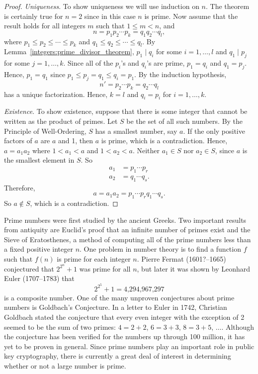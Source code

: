 \begin{proof}
\emph{Uniqueness}.
To show uniqueness we will use induction on $n$. The theorem is certainly true for $n = 2$ since in this case $n$ is prime.  Now assume that the result holds for all integers $m$ such that $1 \leq m < n$, and 
\[
n = p_1 p_2 \cdots p_k = q_1 q_2 \cdots q_l,
\]
where $p_1 \leq p_2 \leq \cdots \leq p_k$ and $q_1 \leq q_2 \leq \cdots \leq q_l$. By Lemma~\ref{integers:prime_divisor_theorem}, $p_1  \mid  q_i$ for some $i = 1, \ldots, l$ and $q_1  \mid  p_j$ for some $j = 1, \ldots, k$.  Since all of the $p_i$'s and $q_i$'s are prime, $p_1 = q_i$ and  $q_1 = p_j$. Hence, $p_1 = q_1$ since $p_1 \leq p_j = q_1 \leq q_i = p_1$.  By the induction hypothesis, 
\[
n' = p_2 \cdots p_k = q_2 \cdots q_l
\]
has a unique factorization.  Hence, $k=l$ and $q_i = p_i$ for $i = 1, \ldots, k$. 

\emph{Existence}.
To show existence, suppose that there is some integer that cannot be written as the product of primes.  Let $S$ be the set of all such numbers.  By the Principle of Well-Ordering, $S$ has a smallest number, say $a$.  If the only positive factors of $a$ are $a$ and 1, then $a$ is prime, which is a contradiction.  Hence, $a = a_1 a_2$ where $1 < a_1 < a$ and $1 < a_2 < a$.  Neither $a_1\in S$ nor $a_2 \in S$, since $a$ is the smallest element in $S$.  So 
\begin{align*}
a_1 & = p_1 \cdots p_r \\
a_2 & = q_1 \cdots q_s.
\end{align*}
Therefore,
\[
a = a_1 a_2 = p_1 \cdots p_r q_1 \cdots q_s.
\]
So $a \notin S$, which is a contradiction.
\end{proof}
 
\histhead

\noindent
\parbox{\textwidth}
{\small \histf
Prime numbers were first studied by the ancient Greeks.  Two important results from antiquity are Euclid's proof that an infinite number of primes exist and the Sieve of Eratosthenes, a method of computing all of the prime numbers less than a fixed positive integer $n$.  One problem in number theory is to find a function $f$ such that $f(n)$ is prime for each integer $n$. Pierre Fermat (1601?--1665) conjectured that $2^{2^n} + 1$ was prime for all $n$, but later it was shown by Leonhard Euler (1707--1783) that 
\[
2^{2^5} + 1 = \text{4,294,967,297}
\]
is a composite number. One of the many unproven conjectures about prime numbers is Goldbach's Conjecture.  In a letter to Euler in 1742, Christian Goldbach stated the conjecture that every even integer with the exception of 2 seemed to be the sum of two primes:  $4 = 2 + 2$, $6 = 3 + 3$, $8 =3 + 5$, $\ldots$.  Although the conjecture has been verified for the numbers up through 100 million, it has yet to be proven in general.  Since prime numbers play an important role in public key cryptography, there is currently a great deal of interest in determining whether or not a large number is prime.
\histbox
}


